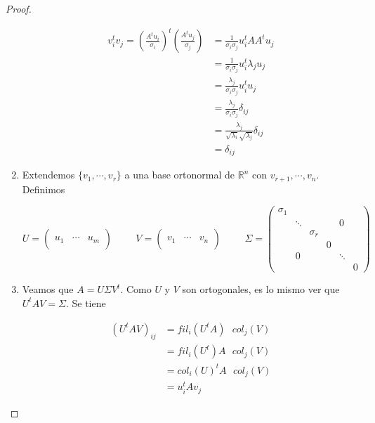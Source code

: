 \begin{teo}
\begin{proof}
\begin{enumerate}
\begin{align*}
v_i^t v_j = \left(\frac{A^t u_i}{\sigma_i}\right)^t \left(\frac{A^t u_j}{\sigma_j}\right)
&= \frac{1}{\sigma_i \sigma_j}u_i^t AA^t u_j\\
&= \frac{1}{\sigma_i \sigma_j} u_i^t \lambda_j u_j\\
&= \frac{\lambda_j}{\sigma_i \sigma_j} u_i^t u_j\\
&= \frac{\lambda_j}{\sigma_i \sigma_j} \delta_{ij}\\
&= \frac{\lambda_j}{\sqrt{\lambda_i} \sqrt{\lambda_j}} \delta_{ij}\\
&= \delta_{ij}
\end{align*}

\item Extendemos $\{v_1, \cdots, v_r\}$ a una base ortonormal de $\mathbb{R}^n$ con $v_{r + 1}, \cdots, v_n$. Definimos

\[U = \begin{pmatrix}
 & & \\
u_1 & \cdots & u_m\\
 & &
\end{pmatrix}
\hspace{1cm}
V = \begin{pmatrix}
 & & \\
v_1 & \cdots & v_n\\
 & &
\end{pmatrix}
\hspace{1cm}
\Sigma = \begin{pmatrix}
\sigma_1		&			&			&		& 			&		\\
			& \ddots		&			&		&	0		&		\\
			&			& \sigma_r 	&		&			&		\\
			&			&			& 0		&			&		\\
			&	0		&			&		& \ddots		&		\\
			&			&			&		&			& 0
\end{pmatrix}\]

\item Veamos que $A = U \Sigma V^t$. Como $U$ y $V$ son ortogonales, es lo mismo ver que $U^t A V = \Sigma$. Se tiene

\begin{align*}
(U^tAV)_{ij} & = fil_i(U^tA) \text{ }col_j(V)\\
			& = fil_i(U^t)A \text{ }col_j(V)\\
			& = col_i(U)^tA \text{ }col_j(V)\\
			& = u_i^t A v_j
\end{align*}


\end{enumerate}
\end{proof}
\end{teo}
